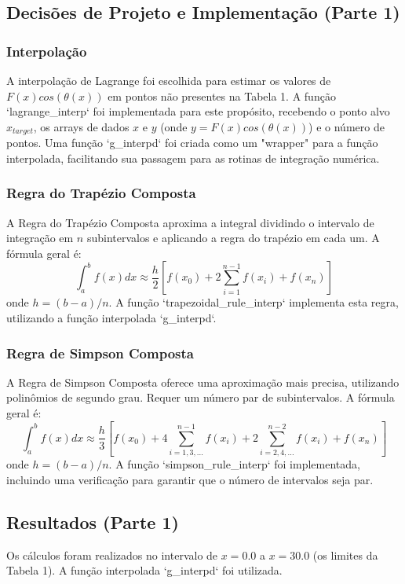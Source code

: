 \documentclass{article}
\begin{document}
\subsection{Decisões de Projeto e Implementação (Parte 1)}
\subsubsection{Interpolação}
A interpolação de Lagrange foi escolhida para estimar os valores de $F(x)cos(\theta(x))$ em pontos não presentes na Tabela 1. A função `lagrange\_interp` foi implementada para este propósito, recebendo o ponto alvo $x_{target}$, os arrays de dados $x$ e $y$ (onde $y = F(x)cos(\theta(x))$) e o número de pontos. Uma função `g\_interpd` foi criada como um "wrapper" para a função interpolada, facilitando sua passagem para as rotinas de integração numérica.

\subsubsection{Regra do Trapézio Composta}
A Regra do Trapézio Composta aproxima a integral dividindo o intervalo de integração em $n$ subintervalos e aplicando a regra do trapézio em cada um. A fórmula geral é:
$$\int_{a}^{b} f(x)dx \approx \frac{h}{2} [f(x_0) + 2\sum_{i=1}^{n-1}f(x_i) + f(x_n)]$$
onde $h = (b-a)/n$. A função `trapezoidal\_rule\_interp` implementa esta regra, utilizando a função interpolada `g\_interpd`.

\subsubsection{Regra de Simpson Composta}
A Regra de Simpson Composta oferece uma aproximação mais precisa, utilizando polinômios de segundo grau. Requer um número par de subintervalos. A fórmula geral é:
$$\int_{a}^{b} f(x)dx \approx \frac{h}{3} [f(x_0) + 4\sum_{i=1,3,...}^{n-1}f(x_i) + 2\sum_{i=2,4,...}^{n-2}f(x_i) + f(x_n)]$$
onde $h = (b-a)/n$. A função `simpson\_rule\_interp` foi implementada, incluindo uma verificação para garantir que o número de intervalos seja par.

\subsection{Resultados (Parte 1)}
Os cálculos foram realizados no intervalo de $x=0.0$ a $x=30.0$ (os limites da Tabela 1). A função interpolada `g\_interpd` foi utilizada.
\end{document}
